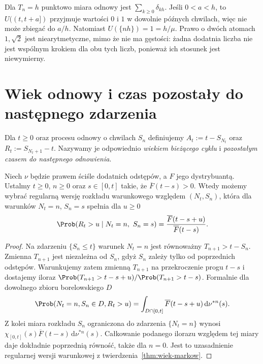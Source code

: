 \begin{przyklad}
Dla $T_n=h$ punktowo miara odnowy jest
$\sum_{k\ge0}\delta_{kh}$.
Jeśli $0<a<h$, to $U((t,t+a])$ przyjmuje
wartości $0$ i $1$ w dowolnie późnych chwilach,
więc nie może zbiegać do $a/h$.
Natomiast $U(\{nh\})=1=h/\mu$.
Prawo o dwóch atomach $1,\sqrt2$ jest
niearytmetyczne, mimo że nie ma gęstości:
żadna dodatnia liczba nie jest wspólnym krokiem
dla obu tych liczb, ponieważ ich stosunek
jest niewymierny.
\end{przyklad}

\section{Wiek odnowy i czas pozostały do następnego zdarzenia}
\begin{definicja}
Dla $t\ge0$ oraz procesu odnowy o chwilach $S_n$ definiujemy
$A_t:=t-S_{N_t}$ oraz $R_t:=S_{N_t+1}-t$.
Nazywamy je odpowiednio \emph{wiekiem bieżącego cyklu}
i \emph{pozostałym czasem do następnego odnowienia}.
\end{definicja}

\begin{stwierdzenie}
Niech $\nu$ będzie prawem ściśle dodatnich odstępów,
a $F$ jego dystrybuantą.
Ustalmy $t\ge0$, $n\ge0$ oraz $s\in[0,t]$ takie, że
$\overline F(t-s)>0$. Wtedy możemy wybrać regularną wersję rozkładu
warunkowego względem $(N_t,S_n)$, która dla
warunków $N_t=n$, $S_n=s$ spełnia dla $u\ge0$
\[
\Prob(R_t>u\mid N_t=n,\ S_n=s)
=\frac{\overline F(t-s+u)}{\overline F(t-s)}.
\]
\end{stwierdzenie}
\begin{proof}
Na zdarzeniu $\{S_n\le t\}$ warunek $N_t=n$
jest równoważny $T_{n+1}>t-S_n$.
Zmienna $T_{n+1}$ jest niezależna od $S_n$, gdyż
$S_n$ zależy tylko od poprzednich odstępów.
Warunkujemy zatem zmienną $T_{n+1}$ na przekroczenie
progu $t-s$ i dostajemy iloraz
$\Prob(T_{n+1}>t-s+u)/\Prob(T_{n+1}>t-s)$.
Formalnie dla dowolnego zbioru borelowskiego $D$
\[
\Prob(N_t=n,S_n\in D,R_t>u)
=\int_{D\cap[0,t]}\overline F(t-s+u)\,\mathrm d\nu^{*n}(s).
\]
Z kolei miara rozkładu $S_n$ ograniczona
do zdarzenia $\{N_t=n\}$ wynosi
$\chi_{[0,t]}(s)\overline F(t-s)\,\mathrm d\nu^{*n}(s)$.
Całkowanie podanego ilorazu względem tej miary
daje dokładnie poprzednią równość, także dla $n=0$.
Jest to uzasadnienie regularnej wersji warunkowej
z twierdzenia~\ref{thm:wiek-markow}.
\end{proof}

